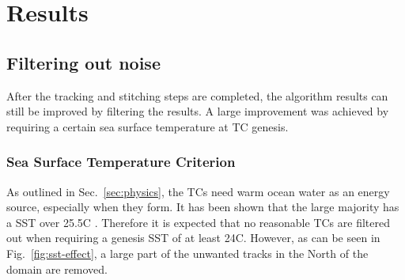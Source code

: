 \chapter{Results}\label{sec:results}

\section{Filtering out noise}\label{sec:noise}
After the tracking and stitching steps are completed, the algorithm results can
still be improved by filtering the results. A large improvement was
achieved by requiring a certain sea surface temperature at TC genesis.
\subsection*{Sea Surface Temperature Criterion}
As outlined in Sec.~\ref{sec:physics}, the TCs need warm ocean water as an
energy source, especially when they form. It has been shown that the large
majority has a SST over 25.5\degree C \cite{sst-paper}. Therefore it is
expected that no reasonable TCs are filtered out when requiring a genesis SST
of at least 24\degree C. However, as can be seen in Fig.~\ref{fig:sst-effect},
a large part of the unwanted tracks in the North of the domain are removed.

